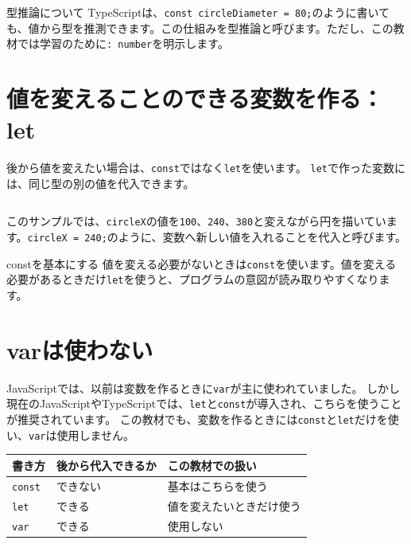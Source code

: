\begin{notebox}{型推論について}
TypeScriptは、\texttt{const circleDiameter = 80;}のように書いても、値から型を推測できます。この仕組みを型推論と呼びます。ただし、この教材では学習のために\texttt{: number}を明示します。
\end{notebox}

\section{値を変えることのできる変数を作る：let}

後から値を変えたい場合は、\texttt{const}ではなく\texttt{let}を使います。
\texttt{let}で作った変数には、同じ型の別の値を代入できます。

\begin{listing}[htbp]
\inputminted{ts}{typescript-p5/listings/chapter04/let-reassignment.ts}
\caption{letで値を変えながら円を描く（\texttt{chapter04/let-reassignment.ts}）}
\label{lst:chapter04-let-reassignment}
\end{listing}

このサンプルでは、\texttt{circleX}の値を\texttt{100}、\texttt{240}、\texttt{380}と変えながら円を描いています。\texttt{circleX = 240;}のように、変数へ新しい値を入れることを代入と呼びます。

\begin{pointbox}{constを基本にする}
値を変える必要がないときは\texttt{const}を使います。値を変える必要があるときだけ\texttt{let}を使うと、プログラムの意図が読み取りやすくなります。
\end{pointbox}

\section{varは使わない}

JavaScriptでは、以前は変数を作るときに\texttt{var}が主に使われていました。
しかし現在のJavaScriptやTypeScriptでは、\texttt{let}と\texttt{const}が導入され、こちらを使うことが推奨されています。
この教材でも、変数を作るときには\texttt{const}と\texttt{let}だけを使い、\texttt{var}は使用しません。

\begin{center}
\begin{tabular}{lll}
\toprule
書き方 & 後から代入できるか & この教材での扱い \\
\midrule
\texttt{const} & できない & 基本はこちらを使う \\
\texttt{let} & できる & 値を変えたいときだけ使う \\
\texttt{var} & できる & 使用しない \\
\bottomrule
\end{tabular}
\end{center}

